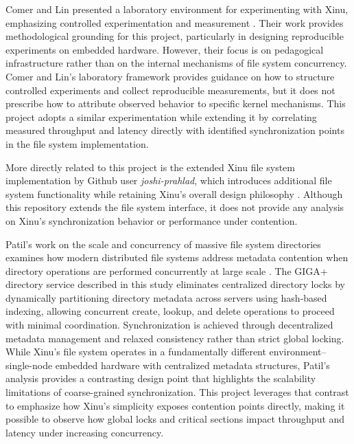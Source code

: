 \documentclass[sigconf]{acmart}
\begin{document}
Comer and Lin presented a laboratory environment for experimenting with Xinu, emphasizing controlled experimentation and measurement \cite{Comer2018ALE}. Their work provides methodological grounding for this project, particularly in designing reproducible experiments on embedded hardware. However, their focus is on pedagogical infrastructure rather than on the internal mechanisms of file system concurrency. Comer and Lin’s laboratory framework provides guidance on how to structure controlled experiments and collect reproducible measurements, but it does not prescribe how to attribute observed behavior to specific kernel mechanisms. This project adopts a similar experimentation while extending it by correlating measured throughput and latency directly with identified synchronization points in the file system implementation.

More directly related to this project is the extended Xinu file system implementation by Github user \textit{joshi-prahlad}, which introduces additional file system functionality while retaining Xinu’s overall design philosophy \cite{joshi2018xinu}. Although this repository extends the file system interface, it does not provide any analysis on Xinu's synchronization behavior or performance under contention. 

Patil’s work on the scale and concurrency of massive file system directories examines how modern distributed file systems address metadata contention when directory operations are performed concurrently at large scale \cite{Patil2013ScaleAC}. The GIGA+ directory service described in this study eliminates centralized directory locks by dynamically partitioning directory metadata across servers using hash-based indexing, allowing concurrent create, lookup, and delete operations to proceed with minimal coordination. Synchronization is achieved through decentralized metadata management and relaxed consistency rather than strict global locking. While Xinu’s file system operates in a fundamentally different environment--single-node embedded hardware with centralized metadata structures, Patil’s analysis provides a contrasting design point that highlights the scalability limitations of coarse-grained synchronization. This project leverages that contrast to emphasize how Xinu’s simplicity exposes contention points directly, making it possible to observe how global locks and critical sections impact throughput and latency under increasing concurrency.
\end{document}
